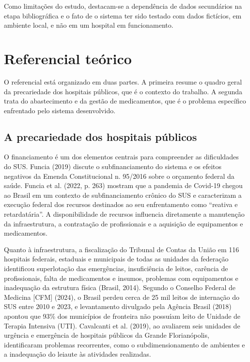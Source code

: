 \documentclass[12pt,a4paper]{article}
\begin{document}
Como limitações do estudo, destacam-se a dependência de dados secundários na etapa bibliográfica e o fato de o sistema ter sido testado com dados fictícios, em ambiente local, e não em um hospital em funcionamento.

\section{Referencial teórico}

O referencial está organizado em duas partes. A primeira resume o quadro geral da precariedade dos hospitais públicos, que é o contexto do trabalho. A segunda trata do abastecimento e da gestão de medicamentos, que é o problema específico enfrentado pelo sistema desenvolvido.

\subsection{A precariedade dos hospitais públicos}

O financiamento é um dos elementos centrais para compreender as dificuldades do SUS. Funcia (2019) discute o subfinanciamento do sistema e os efeitos negativos da Emenda Constitucional n. 95/2016 sobre o orçamento federal da saúde. Funcia et al. (2022, p. 263) mostram que a pandemia de Covid-19 chegou ao Brasil em um contexto de subfinanciamento crônico do SUS e caracterizam a execução federal dos recursos destinados ao seu enfrentamento como ``reativa e retardatária''. A disponibilidade de recursos influencia diretamente a manutenção da infraestrutura, a contratação de profissionais e a aquisição de equipamentos e medicamentos.

Quanto à infraestrutura, a fiscalização do Tribunal de Contas da União em 116 hospitais federais, estaduais e municipais de todas as unidades da federação identificou superlotação das emergências, insuficiência de leitos, carência de profissionais, falta de medicamentos e insumos, problemas com equipamentos e inadequação da estrutura física (Brasil, 2014). Segundo o Conselho Federal de Medicina [CFM] (2024), o Brasil perdeu cerca de 25 mil leitos de internação do SUS entre 2010 e 2023, e levantamento divulgado pela Agência Brasil (2018) apontou que 93\% dos municípios de fronteira não possuíam leito de Unidade de Terapia Intensiva (UTI). Cavalcanti et al. (2019), ao avaliarem seis unidades de urgência e emergência de hospitais públicos da Grande Florianópolis, identificaram problemas recorrentes, como o subdimensionamento de ambientes e a inadequação do leiaute às atividades realizadas.
\end{document}
